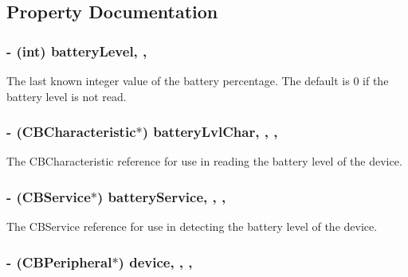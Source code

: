 \subsection{Property Documentation}
\hypertarget{interface_jawbone_u_p24_a7c1af9ec44bfb9a3fafcf6d3ba1a3dc9}{
\subsubsection[{battery\-Level}]{\setlength{\rightskip}{0pt plus 5cm}-\/ (int) battery\-Level\hspace{0.3cm}{\ttfamily [read]}, {\ttfamily [write]}, {\ttfamily [atomic]}}}\label{interface_jawbone_u_p24_a7c1af9ec44bfb9a3fafcf6d3ba1a3dc9}
The last known integer value of the battery percentage. The default is 0 if the battery level is not read. \hypertarget{interface_jawbone_u_p24_ac0feafa5d2a26db099b3328df1cc85e1}{
\subsubsection[{battery\-Lvl\-Char}]{\setlength{\rightskip}{0pt plus 5cm}-\/ (C\-B\-Characteristic$\ast$) battery\-Lvl\-Char\hspace{0.3cm}{\ttfamily [read]}, {\ttfamily [write]}, {\ttfamily [atomic]}, {\ttfamily [retain]}}}\label{interface_jawbone_u_p24_ac0feafa5d2a26db099b3328df1cc85e1}
The C\-B\-Characteristic reference for use in reading the battery level of the device. \hypertarget{interface_jawbone_u_p24_a60f0270de3139d5219544969cce08293}{
\subsubsection[{battery\-Service}]{\setlength{\rightskip}{0pt plus 5cm}-\/ (C\-B\-Service$\ast$) battery\-Service\hspace{0.3cm}{\ttfamily [read]}, {\ttfamily [write]}, {\ttfamily [atomic]}, {\ttfamily [retain]}}}\label{interface_jawbone_u_p24_a60f0270de3139d5219544969cce08293}
The C\-B\-Service reference for use in detecting the battery level of the device. \hypertarget{interface_jawbone_u_p24_a9ed19c4b26f90dfbf9523ba2b7dbf6e0}{
\subsubsection[{device}]{\setlength{\rightskip}{0pt plus 5cm}-\/ (C\-B\-Peripheral$\ast$) device\hspace{0.3cm}{\ttfamily [read]}, {\ttfamily [write]}, {\ttfamily [atomic]}, {\ttfamily [retain]}}}\label{interface_jawbone_u_p24_a9ed19c4b26f90dfbf9523ba2b7dbf6e0}
